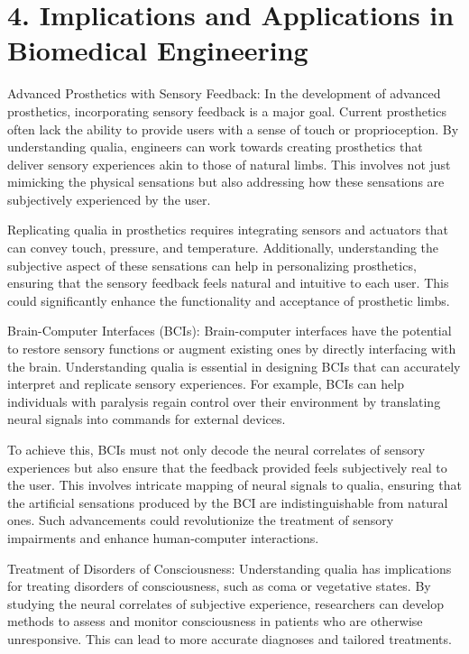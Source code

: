 \documentclass{article}
\begin{document}
\section*{4. Implications and Applications in Biomedical Engineering}

Advanced Prosthetics with Sensory Feedback:
In the development of advanced prosthetics, incorporating sensory feedback is a major goal. Current prosthetics often lack the ability to provide users with a sense of touch or proprioception. By understanding qualia, engineers can work towards creating prosthetics that deliver sensory experiences akin to those of natural limbs. This involves not just mimicking the physical sensations but also addressing how these sensations are subjectively experienced by the user.

Replicating qualia in prosthetics requires integrating sensors and actuators that can convey touch, pressure, and temperature. Additionally, understanding the subjective aspect of these sensations can help in personalizing prosthetics, ensuring that the sensory feedback feels natural and intuitive to each user. This could significantly enhance the functionality and acceptance of prosthetic limbs.

Brain-Computer Interfaces (BCIs):
Brain-computer interfaces have the potential to restore sensory functions or augment existing ones by directly interfacing with the brain. Understanding qualia is essential in designing BCIs that can accurately interpret and replicate sensory experiences. For example, BCIs can help individuals with paralysis regain control over their environment by translating neural signals into commands for external devices.

To achieve this, BCIs must not only decode the neural correlates of sensory experiences but also ensure that the feedback provided feels subjectively real to the user. This involves intricate mapping of neural signals to qualia, ensuring that the artificial sensations produced by the BCI are indistinguishable from natural ones. Such advancements could revolutionize the treatment of sensory impairments and enhance human-computer interactions.

Treatment of Disorders of Consciousness:
Understanding qualia has implications for treating disorders of consciousness, such as coma or vegetative states. By studying the neural correlates of subjective experience, researchers can develop methods to assess and monitor consciousness in patients who are otherwise unresponsive. This can lead to more accurate diagnoses and tailored treatments.
\end{document}
